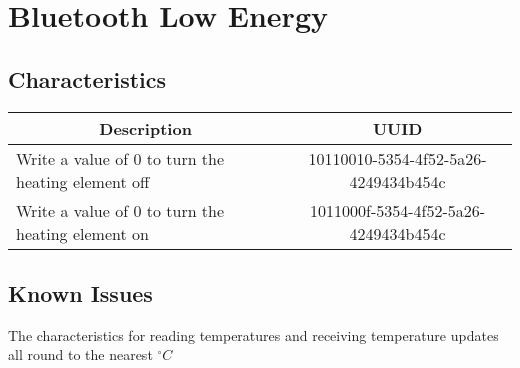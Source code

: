 \chapter{Bluetooth Low Energy}
\section{Characteristics}
\begin{tabular}{p{2.3in}|c}
\multicolumn{1}{c|}{\textbf{Description}} & \textbf{UUID} \\ \hline
Write a value of 0 to turn the heating element off & 10110010-5354-4f52-5a26-4249434b454c \\ \hline
Write a value of 0 to turn the heating element on & 1011000f-5354-4f52-5a26-4249434b454c \\ \hline

\end{tabular}
\section{Known Issues}
The characteristics for reading temperatures and receiving temperature updates all round to the nearest $^\circ C$